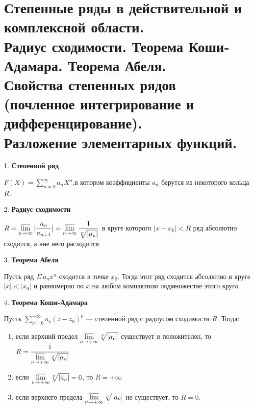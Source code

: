 \section{
    Степенные ряды в действительной и комплексной области. \\
    Радиус сходимости. Теорема Коши-Адамара. Теорема Абеля. \\
    Свойства степенных рядов (почленное интегрирование и дифференцирование). \\
    Разложение элементарных функций. 
}

1. \textbf{Степенной ряд}

${\displaystyle F(X)=\sum \limits _{n=0}^{\infty }a_{n}X^{n}}$,в котором коэффициенты 
${\displaystyle {a_{n}}}$ берутся из некоторого кольца ${\displaystyle {R}}$.

2. \textbf{Радиус сходимости}

$\displaystyle R = \varlimsup _{n \to \infty} | \frac{a_n}{a_{n+1}}| = \varlimsup _{n \to \infty} \frac{1}{{\sqrt[{n}]{|a_n|}}}$ 
в круге которого $\displaystyle |x - x_0| < R$ ряд абсолютно сходится, а вне него расходится 

3. \textbf{Теорема Абеля}

Пусть ряд ${\displaystyle \Sigma \,a_{n}x^{n}}$ 
сходится в точке ${\displaystyle {x_{0}}}$. 
Тогда этот ряд сходится абсолютно в круге ${\displaystyle {|x|<|x_{0}|}}$
и равномерно по ${\displaystyle {x}}$ на любом компактном подмножестве этого круга.

4. \textbf{Теорема Коши-Адамара}

Пусть ${\displaystyle \sum _{\nu =0}^{+\infty }a_{\nu }(z-z_{0})^{\nu }}$
 — степенной ряд с радиусом сходимости ${\displaystyle R}$. Тогда:
 \begin{enumerate}
     \item если верхний предел ${\displaystyle \varlimsup \limits _{\nu \to +\infty }{\sqrt[{\nu }]{|a_{\nu }|}}}$
     существует и положителен, то ${\displaystyle R={\frac {1}{\varlimsup \limits _{\nu \to +\infty }{\sqrt[{\nu }]{|a_{\nu }|}}}}}$
     \item если ${\displaystyle \varlimsup \limits _{\nu \to +\infty }{\sqrt[{\nu }]{|a_{\nu }|}}=0}$, 
     то ${\displaystyle R=+\infty }$
     \item если верхнего предела ${\displaystyle \varlimsup \limits _{\nu \to +\infty }{\sqrt[{\nu }]{|a_{\nu }|}}}$
     не существует, то ${\displaystyle R=0}$.
 \end{enumerate}

